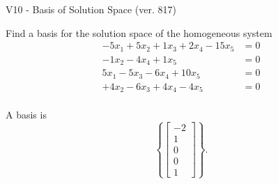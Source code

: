 \begin{exercise}
  \begin{exerciseTitle}V10 - Basis of Solution Space (ver. 817)\end{exerciseTitle}
  \begin{exerciseStatement}
    Find a basis for the solution space of the homogeneous system 
\begin{align*}
 -5 x_ 1 + 5 x_ 2 + 1 x_ 3 + 2 x_ 4 -15 x_ 5 &= 0  \\ 
  -1 x_ 2 -4 x_ 4 + 1 x_ 5 &= 0  \\ 
  5 x_ 1 -5 x_ 3 -6 x_ 4 + 10 x_ 5 &= 0  \\ 
  + 4 x_ 2 -6 x_ 3 + 4 x_ 4 -4 x_ 5 &= 0  \\ 
 \end{align*}


 
  \end{exerciseStatement}

  \begin{exerciseAnswer}
   A basis is   
\[\left\{\left[\begin{array}{c}
-2 \\
1 \\
0 \\
0 \\
1
\end{array}\right]\right\}.\]

  


  \end{exerciseAnswer}
\end{exercise}